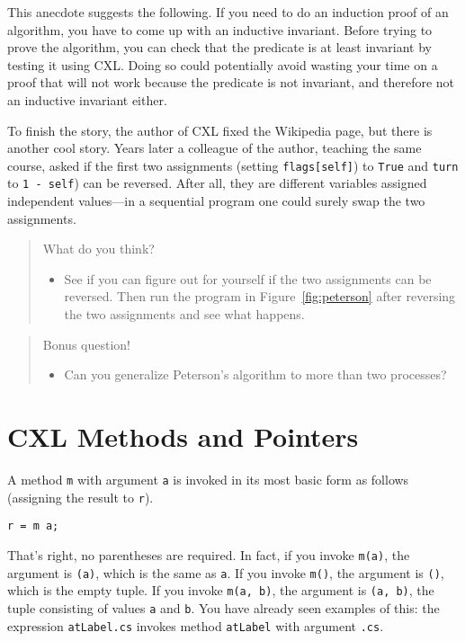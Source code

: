 \documentclass{report}
\newenvironment{code}{
\tcolorbox
}{
\endtcolorbox
}
\begin{document}
This anecdote suggests the following.  If you need to do an induction
proof of an algorithm, you have to come up with an inductive invariant.
Before trying to prove the algorithm, you can check that the predicate is
at least invariant by testing it using CXL.  Doing so could potentially
avoid wasting your time on a proof that will not work because the
predicate is not invariant, and therefore not an inductive invariant either.

To finish the story, the author of CXL fixed the Wikipedia page, but there
is another cool story.  Years later a colleague of the author, teaching
the same course, asked if the first two assignments (setting \texttt{flags[self]})
to \texttt{True} and \texttt{turn} to \texttt{1 - self}) can be reversed.
After all, they are different variables assigned independent values---in a
sequential program one could surely swap the two assignments.

\begin{quote}
What do you think?
\begin{itemize}
\item See if you can figure out for yourself if the two assignments can be
reversed.  Then run the program in Figure~\ref{fig:peterson} after reversing
the two assignments and see what happens.
\end{itemize}
\end{quote}

\begin{quote}
Bonus question!
\begin{itemize}
\item Can you generalize Peterson's algorithm to more than two processes?
\end{itemize}
\end{quote}

\chapter{CXL Methods and Pointers}

A method \texttt{m} with argument \texttt{a} is invoked in its
most basic form as follows (assigning the result to \texttt{r}).
\begin{code}
\begin{verbatim}
r = m a;
\end{verbatim}
\end{code}
That's right, no parentheses are required.  In fact, if you invoke
\texttt{m(a)}, the argument is \texttt{(a)}, which is the same
as \texttt{a}.
If you invoke \texttt{m()}, the argument is \texttt{()},
which is the empty tuple.
If you invoke \texttt{m(a, b)}, the argument is \texttt{(a, b)},
the tuple consisting of values \texttt{a} and \texttt{b}.
You have already seen examples of this: the expression
\texttt{atLabel.cs} invokes method \texttt{atLabel} with
argument \texttt{.cs}.
\end{document}
